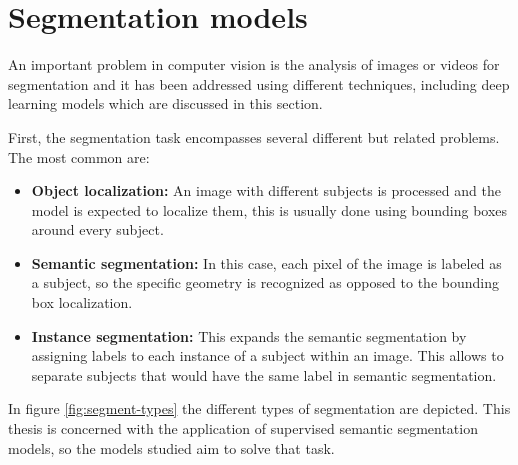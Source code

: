 \section{Segmentation models}
An important problem in computer vision is the analysis of images or videos for segmentation and it has been addressed using different techniques, including deep learning models which are discussed in this section.

First, the segmentation task encompasses several different but related problems. The most common are: 
\begin{itemize}
    \item \textbf{Object localization:} An image with different subjects is processed and the model is expected to localize them, this is usually done using bounding boxes around every subject.
    
    \item \textbf{Semantic segmentation:} In this case, each pixel of the image is labeled as a subject, so the specific geometry is recognized as opposed to the bounding box localization.
    
    \item \textbf{Instance segmentation:} This expands the semantic segmentation by assigning labels to each instance of a subject within an image. This allows to separate subjects that would have the same label in semantic segmentation.
\end{itemize}

In figure \ref{fig:segment-types} the different types of segmentation are depicted. This thesis is concerned with the application of supervised semantic segmentation models, so the models studied aim to solve that task.

